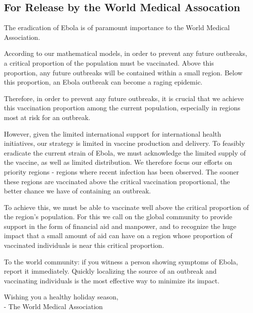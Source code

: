 \documentclass{article}
\begin{document}
\printbibliography

\clearpage

\begin{appendices}
\section{For Release by the World Medical Assocation}

The eradication of Ebola is of paramount importance to the World Medical Association.

According to our mathematical models, in order to prevent any future outbreaks, a critical proportion of the population must be vaccinated. Above this proportion, any future outbreaks will be contained within a small region. Below this proportion, an Ebola outbreak can become a raging epidemic.

Therefore, in order to prevent any future outbreaks, it is crucial that we achieve this vaccination proportion among the current population, especially in regions most at risk for an outbreak. 

However, given the limited international support for international health initiatives, our strategy is limited in vaccine production and delivery. To feasibly eradicate the current strain of Ebola, we must acknowledge the limited supply of the vaccine, as well as limited distribution. We therefore focus our efforts on priority regions - regions where recent infection has been observed. The sooner these regions are vaccinated above the critical vaccination proportional, the better chance we have of containing an outbreak.

To achieve this, we must be able to vaccinate well above the critical proportion of the region's population. For this we call on the global community to provide support in the form of financial aid and manpower, and to recognize the huge impact that a small amount of aid can have on a region whose proportion of vaccinated individuals is near this critical proportion. 

To the world community: if you witness a person showing symptoms of Ebola, report it immediately. Quickly localizing the source of an outbreak and vaccinating individuals is the most effective way to minimize its impact.

Wishing you a healthy holiday season,
\\
- The World Medical Association

\end{appendices}
\end{document}
